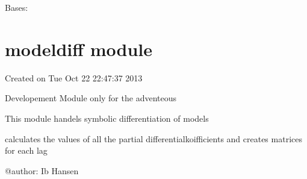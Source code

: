 \documentclass[letterpaper,10pt,english]{sphinxmanual}
\begin{document}
\begin{fulllineitems}
\label{\detokenize{unsorted/modeldashboot:modeldashboot.Dash_Mixin}}
\pysigstartsignatures
{}
\pysigstopsignatures
\sphinxAtStartPar
Bases: 

\begin{fulllineitems}
\label{\detokenize{unsorted/modeldashboot:modeldashboot.Dash_Mixin.modeldash}}
\pysigstartsignatures
{}
\pysigstopsignatures
\end{fulllineitems}


\end{fulllineitems}


\sphinxstepscope


\section{modeldiff module}
\label{\detokenize{unsorted/modeldiff:module-modeldiff}}\label{\detokenize{unsorted/modeldiff:modeldiff-module}}\label{\detokenize{unsorted/modeldiff::doc}}
\sphinxAtStartPar
Created on Tue Oct 22 22:47:37 2013

\sphinxAtStartPar
Developement Module \sphinxhyphen{} only for the adventeous

\sphinxAtStartPar
This module handels symbolic differentiation of models

\sphinxAtStartPar
calculates the values of all the partial differentialkoifficients
and creates matrices for each lag

\sphinxAtStartPar
@author: Ib Hansen
\end{document}
